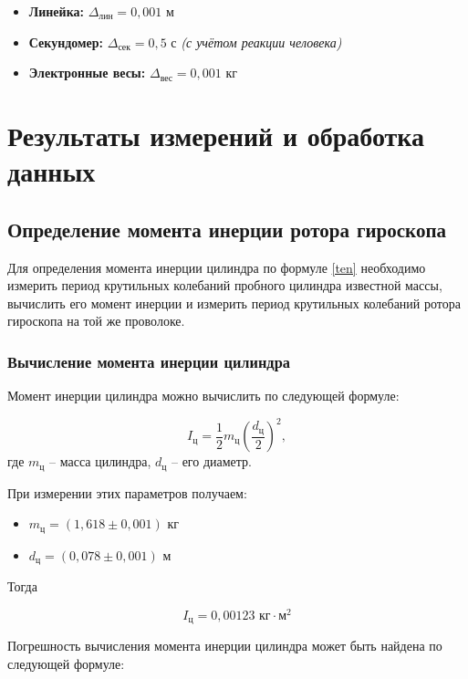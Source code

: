 \documentclass[a4paper,12pt]{article} %
\begin{document}
\begin{itemize}
	\item \textbf{Линейка:} $ \Delta_\text{лин} = 0,001 $ м
	\item \textbf{Секундомер:} $ \Delta_\text{сек} = 0,5 $ с \textit{(с учётом реакции человека)}
	\item \textbf{Электронные весы:} $ \Delta_\text{вес} = 0,001 $ кг
\end{itemize}

\section{Результаты измерений и обработка данных}

\subsection{Определение момента инерции ротора гироскопа}

Для определения момента инерции цилиндра по формуле \eqref{ten} необходимо измерить период крутильных колебаний пробного цилиндра известной массы, вычислить его момент инерции и измерить период крутильных колебаний ротора гироскопа на той же проволоке.

\subsubsection{Вычисление момента инерции цилиндра}

Момент инерции цилиндра можно вычислить по следующей формуле:

\begin{equation}
I_\text{ц} = \frac{1}{2}m_\text{ц}\left( \frac{d_\text{ц}}{2}\right)^2,
\end{equation}
где $ m_\text{ц} $ -- масса цилиндра, $ d_\text{ц} $ -- его диаметр.

При измерении этих параметров получаем:
\begin{itemize}
	\item $ m_\text{ц} = \left( 1,618 \pm 0,001\right) $ кг
	\item $ d_\text{ц} = \left( 0,078 \pm 0,001 \right) $ м
\end{itemize}

Тогда

\begin{equation}
I_\text{ц} = 0,00123 \text{ кг} \cdot \text{м}^2
\end{equation}

Погрешность вычисления момента инерции цилиндра может быть найдена по следующей формуле:
\end{document}
